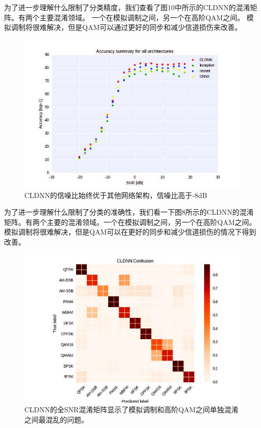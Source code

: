为了进一步理解什么限制了分类精度，我们查看了图10中所示的CLDNN的混淆矩阵。有两个主要混淆领域。 一个在模拟调制之间，另一个在高阶QAM之间。 模拟调制将很难解决，但是QAM可以通过更好的同步和减少信道损伤来改善。\par

\begin{figure}[!h]
	\centering
	\includegraphics[scale=1]{figures/chapter_5/fig7}
	\caption{CLDNN的信噪比始终优于其他网络架构，信噪比高于-8dB}
\end{figure}

为了进一步理解什么限制了分类的准确性，我们看一下图8所示的CLDNN的混淆矩阵。有两个主要的混淆领域。一个在模拟调制之间，另一个在高阶QAM之间。模拟调制将很难解决，但是QAM可以在更好的同步和减少信道损伤的情况下得到改善。\par

\begin{figure}[!h]
	\centering
	\includegraphics[scale=1]{figures/chapter_5/fig8}
	\caption{CLDNN的全SNR混淆矩阵显示了模拟调制和高阶QAM之间单独混淆之间最混乱的问题。}
\end{figure}

